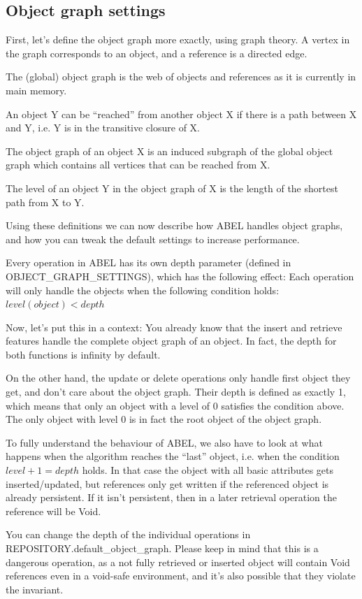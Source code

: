 \subsection{Object graph settings}

First, let's define the object graph more exactly, using graph theory.
A vertex in the graph corresponds to an object, and a reference is a directed edge.

The (global) object graph is the web of objects and references as it is currently in main memory.

An object Y can be ``reached'' from another object X if there is a path between X and Y, i.e. Y is in the transitive closure of X.

The object graph of an object X is an induced subgraph of the global object graph which contains all vertices that can be reached from X.

The level of an object Y in the object graph of X is the length of the shortest path from X to Y.

Using these definitions we can now describe how ABEL handles object graphs, and how you can tweak the default settings to increase performance.

Every operation in ABEL has its own depth parameter (defined in OBJECT\_GRAPH\_SETTINGS), which has the following effect:
Each operation will only handle the objects when the following condition holds: $ level(object) < depth $

Now, let's put this in a context:
You already know that the insert and retrieve features handle the complete object graph of an object. 
In fact, the depth for both functions is infinity by default.

On the other hand, the update or delete operations only handle first object they get, and don't care about the object graph.
Their depth is defined as exactly 1, which means that only an object with a level of 0 satisfies the condition above.
The only object with level 0 is in fact the root object of the object graph.

To fully understand the behaviour of ABEL, we also have to look at what happens when the algorithm reaches the ``last'' object, i.e. when the condition $level + 1 = depth$ holds.
In that case the object with all basic attributes gets inserted/updated, but references only get written if the referenced object is already persistent.
If it isn't persistent, then in a later retrieval operation the reference will be Void.

You can change the depth of the individual operations in REPOSITORY.default\_object\_graph. 
Please keep in mind that this is a dangerous operation, as a not fully retrieved or inserted object will contain Void references even in a void-safe environment, and it's also possible that they violate the invariant.


